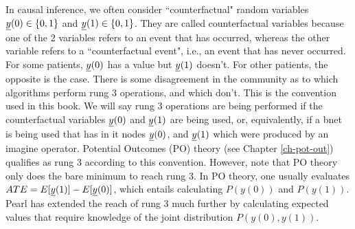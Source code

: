 In causal inference,
we often
consider  
``counterfactual"
random variables ${\underline{y}}(0)\in \{0,1\}$
and ${\underline{y}}(1)\in\{0,1\}$. They are called
counterfactual variables because
one of the 2 variables 
refers to an event that has occurred,
whereas the other variable
refers to a ``counterfactual  event",
i.e., an event that has never 
occurred. For some patients,
${\underline{y}}(0)$ has a value
but ${\underline{y}}(1)$
doesn't.
For other 
patients,
the opposite 
is the case.
There is some
disagreement in the
community
as to which algorithms
perform rung 3 operations,
and which don't.
This is the convention
used in this book.
We will
say rung 3 operations
are being performed 
if
the counterfactual variables ${\underline{y}}(0)$
and ${\underline{y}}(1)$
are being used,
or, equivalently,
if a bnet
is being used that
has in it nodes ${\underline{y}}(0)$, and ${\underline{y}}(1)$
which were produced by an imagine operator.
Potential Outcomes (PO)
theory (see Chapter \ref{ch-pot-out})
qualifies as rung 3 according
to this convention.
However, note that PO theory 
only does the bare minimum 
to reach rung 3.
In PO theory, one usually
evaluates $ATE=E[{\underline{y}}(1)]-E[{\underline{y}}(0)]$,
which entails
calculating $P(y(0))$
and $P(y(1))$.
Pearl has extended the reach of rung 3
much further 
by calculating expected
values that require knowledge of
the joint distribution $P(y(0), y(1))$.

